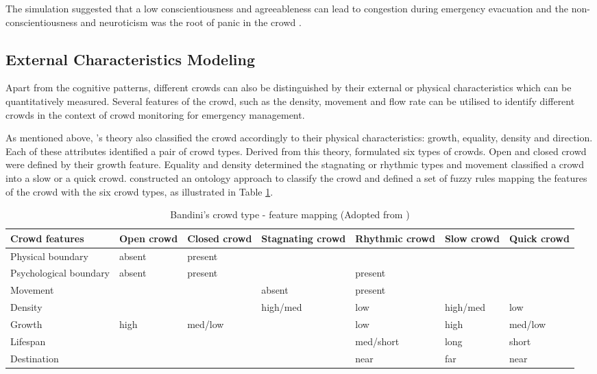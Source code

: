 The simulation suggested that a low conscientiousness and agreeableness can lead to congestion during emergency evacuation and the non-conscientiousness and neuroticism was the root of panic in the crowd \citep{Durupinar2008}.

\subsection{External Characteristics Modeling}

Apart from the cognitive patterns, different crowds can also be distinguished by their external or physical characteristics which can be quantitatively measured. Several features of the crowd, such as the density, movement and flow rate can be utilised to identify different crowds in the context of crowd monitoring for emergency management.

As mentioned above, \citet{Canetti1962}’s theory also classified the crowd accordingly to their physical characteristics: growth, equality, density and direction. Each of these attributes identified a pair of crowd types. Derived from this theory, \citet{Bandini2011} formulated six types of crowds. Open and closed crowd were defined by their growth feature. Equality and density determined the stagnating or rhythmic types and movement classified a crowd into a slow or a quick crowd. \citet{Bandini2011} constructed an ontology approach to classify the crowd and defined a set of fuzzy rules mapping the features of the crowd with the six crowd types, as illustrated in Table \ref{table:bandiniCrowdType}.

\begin{table}[!htbp]
	\caption{Bandini's crowd type - feature mapping (Adopted from \citet{Bandini2011})}
	\label{table:bandiniCrowdType}
	\centering
	\begin{tabular}{|p{2.5cm}|p{1.5cm}|p{1.5cm}|p{2cm}|p{2cm}|p{1.5cm}|p{1.5cm}|}
		\hline
		\textbf{Crowd features} & \textbf{Open crowd} & \textbf{Closed crowd} & \textbf{Stagnating crowd} & \textbf{Rhythmic crowd} & \textbf{Slow crowd} & \textbf{Quick crowd} \\ \hline \hline
		Physical boundary & absent & present & & & & \\ \hline
		Psychological boundary & absent & present & & present & & \\ \hline
		Movement & & & absent & present & & \\ \hline
		Density & & & high/med & low & high/med & low \\ \hline
		Growth & high & med/low & & low & high & med/low \\ \hline
		Lifespan & & & & med/short & long & short \\ \hline
		Destination & & & & near & far & near \\ \hline
	\end{tabular}
\end{table}

